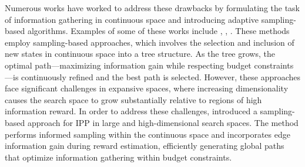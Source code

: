 Numerous works have worked to address these drawbacks by formulating the task of information gathering in continuous space and introducing adaptive sampling-based algorithms. Examples of some of these works include \cite{hollinger_sampling-based_2014}, \cite{schmid_efficient_2020}, \cite{hollinger_long-horizon_2015, nasa-mcts, adaptive-sampling-1, adaptive-sampling-2, 6907763, 6630605}. These methods employ sampling-based approaches, which involves the selection and inclusion of new states in continuous space into a tree structure. As the tree grows, the optimal path---maximizing information gain while respecting budget constraints---is continuously refined and the best path is selected. However, these approaches face significant challenges in expansive spaces, where increasing dimensionality causes the search space to grow substantially relative to regions of high information reward. In order to address these challenges, \cite{moon2022tigris} introduced a sampling-based approach for IPP in large and high-dimensional search spaces. The method performs informed sampling within the continuous space and incorporates edge information gain during reward estimation, efficiently generating global paths that optimize information gathering within budget constraints.



